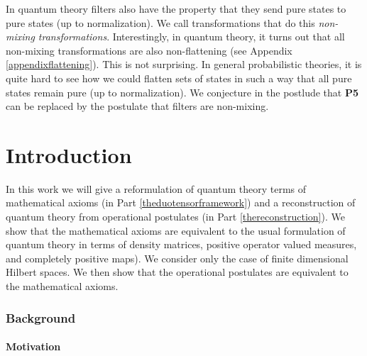 \documentclass[10pt]{article}
\begin{document}
In quantum theory filters also have the property that they send pure states to pure states (up to normalization).  We call transformations that do this \emph{non-mixing transformations}.  Interestingly, in quantum theory, it turns out that all non-mixing transformations are also non-flattening (see Appendix \ref{appendixflattening}).  This is not surprising.  In general probabilistic theories, it is quite hard to see how we could flatten sets of states in such a way that all pure states remain pure (up to normalization).  We conjecture in the postlude that {\bf P5} can be replaced by the postulate that filters are non-mixing.





\newpage

\part{Introduction}

In this work we will give a reformulation of quantum theory terms of mathematical axioms (in Part \ref{theduotensorframework}) and a reconstruction of quantum theory from operational postulates (in Part \ref{thereconstruction}).  We show that the mathematical axioms are equivalent to the usual formulation of quantum theory in terms of density matrices, positive operator valued measures, and completely positive maps).  We consider only the case of finite dimensional Hilbert spaces.   We then show that the operational postulates are equivalent to the mathematical axioms.

\section{Background}

\subsection{Motivation}
\end{document}
